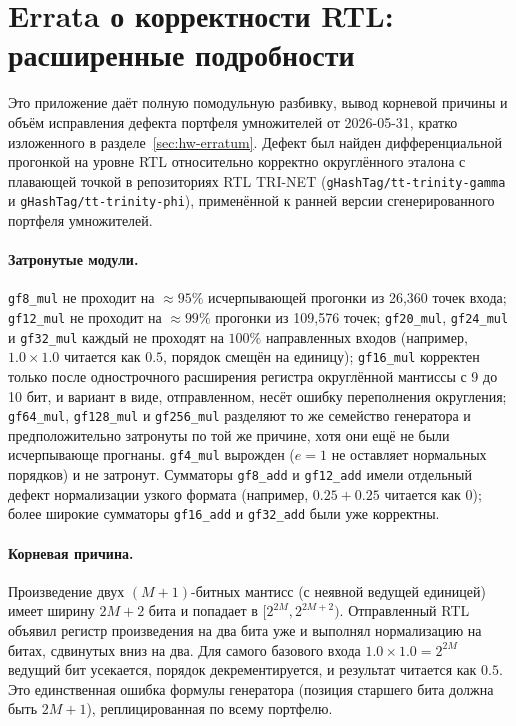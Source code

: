 \documentclass[11pt,a4paper]{article}
\theoremstyle{plain}
\begin{document}
\section{Errata о корректности RTL: расширенные подробности}\label{app:erratum}

Это приложение даёт полную помодульную разбивку, вывод корневой причины и объём
исправления дефекта портфеля умножителей от 2026-05-31, кратко изложенного в
разделе~\ref{sec:hw-erratum}. Дефект был найден дифференциальной прогонкой на
уровне RTL относительно корректно округлённого эталона с плавающей точкой в
репозиториях RTL TRI-NET
(\texttt{gHashTag/tt-trinity-gamma} и \texttt{gHashTag/tt-trinity-phi}),
применённой к ранней версии сгенерированного портфеля умножителей.

\paragraph{Затронутые модули.}
\texttt{gf8\_mul} не проходит на \(\approx 95\%\) исчерпывающей прогонки из
26{,}360 точек входа; \texttt{gf12\_mul} не проходит на \(\approx 99\%\)
прогонки из 109{,}576 точек; \texttt{gf20\_mul}, \texttt{gf24\_mul} и
\texttt{gf32\_mul} каждый не проходят на \(100\%\) направленных входов (например,
\(1.0 \times 1.0\) читается как \(0.5\), порядок смещён на единицу);
\texttt{gf16\_mul} корректен только после однострочного расширения регистра
округлённой мантиссы с 9 до 10 бит, и вариант в виде, отправленном, несёт ошибку
переполнения округления; \texttt{gf64\_mul}, \texttt{gf128\_mul} и
\texttt{gf256\_mul} разделяют то же семейство генератора и предположительно
затронуты по той же причине, хотя они ещё не были исчерпывающе прогнаны.
\texttt{gf4\_mul} вырожден (\(e = 1\) не оставляет нормальных порядков) и не
затронут. Сумматоры \texttt{gf8\_add} и \texttt{gf12\_add} имели отдельный
дефект нормализации узкого формата (например, \(0.25 + 0.25\) читается как
\(0\)); более широкие сумматоры \texttt{gf16\_add} и \texttt{gf32\_add} были уже
корректны.

\paragraph{Корневая причина.}
Произведение двух \((M+1)\)-битных мантисс (с неявной ведущей единицей)
имеет ширину \(2M+2\) бита и попадает в \([2^{2M}, 2^{2M+2})\). Отправленный RTL
объявил регистр произведения на два бита уже и выполнял нормализацию на битах,
сдвинутых вниз на два. Для самого базового входа
\(1.0 \times 1.0 = 2^{2M}\) ведущий бит усекается, порядок декрементируется, и
результат читается как \(0.5\). Это единственная ошибка формулы генератора
(позиция старшего бита должна быть \(2M + 1\)), реплицированная по всему
портфелю.
\end{document}

